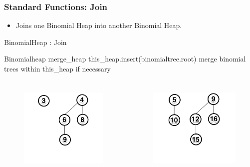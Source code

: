 \documentclass[13pt]{beamer}
\begin{document}
\begin{frame}
\frametitle{Standard Functions: Join}
  \begin{itemize}
    \item Joins one Binomial Heap into another Binomial Heap. 
  \end{itemize}

  \begin{algorithm}[H]
    \small
    \caption{BinomialHeap : Join}
    \begin{algorithmic}
      \REQUIRE Binomialheap merge\_heap
        \STATE this\_heap.insert(binomialtree.root)
        \STATE merge binomial trees within this\_heap if necessary
      \ENDFOR
    \end{algorithmic}
  \end{algorithm}

  \begin{columns}[T] %
    \begin{column}[T]{5.5cm} %
       \begin{figure}
        \includegraphics[height=4.25cm]{./img/joinorig.png}
      \end{figure}
    \end{column}
    \begin{column}[T]{8.5cm} %
      \begin{figure}
        \includegraphics[height=4.25cm]{./img/joinnew.png}
      \end{figure}
    \end{column}
  \end{columns}

\end{frame}
\end{document}
